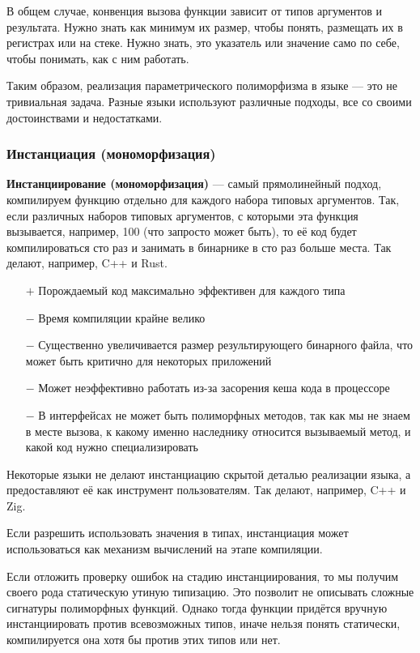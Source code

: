 \documentclass[12pt]{article}
\newcommand{\vocab}[1]{\textbf{#1}} %
\newcommand{\positive}{$+$} %
\newcommand{\negative}{{\color{red} $-$}} %
\begin{document}
    В общем случае, конвенция вызова функции зависит от типов аргументов и результата.
    Нужно знать как минимум их размер, чтобы понять, размещать их в регистрах или на стеке.
    Нужно знать, это указатель или значение само по себе, чтобы понимать, как с ним работать.

    Таким образом, реализация параметрического полиморфизма в языке --- это не тривиальная задача.
    Разные языки используют различные подходы, все со своими достоинствами и недостатками.

    \subsubsection{Инстанциация (мономорфизация)}

    \vocab{Инстанциирование (мономорфизация)} --- самый прямолинейный подход, компилируем функцию отдельно для каждого набора типовых аргументов.
    Так, если различных наборов типовых аргументов, с которыми эта функция вызывается, например, 100 (что запросто может быть), то её код будет компилироваться сто раз и занимать в бинарнике в сто раз больше места.
    Так делают, например, C++ и Rust.

    \begin{itemize}
        \item[\positive] Порождаемый код максимально эффективен для каждого типа
        \item[\negative] Время компиляции крайне велико
        \item[\negative] Существенно увеличивается размер результирующего бинарного файла, что может быть критично для некоторых приложений
        \item[\negative] Может неэффективно работать из-за засорения кеша кода в процессоре
        \item[\negative] В интерфейсах не может быть полиморфных методов, так как мы не знаем в месте вызова, к какому именно наследнику относится вызываемый метод, и какой код нужно специализировать
    \end{itemize}

    Некоторые языки не делают инстанциацию скрытой деталью реализации языка, а предоставляют её как инструмент пользователям.
    Так делают, например, C++ и Zig.

    Если разрешить использовать значения в типах, инстанциация может использоваться как механизм вычислений на этапе компиляции.

    Если отложить проверку ошибок на стадию инстанциирования, то мы получим своего рода статическую утиную типизацию.
    Это позволит не описывать сложные сигнатуры полиморфных функций.
    Однако тогда функции придётся вручную инстанциировать против всевозможных типов, иначе нельзя понять статически, компилируется она хотя бы против этих типов или нет.
\end{document}
